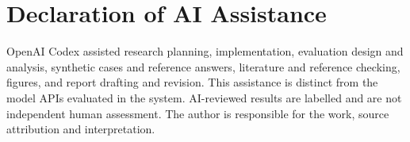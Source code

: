 \section*{Declaration of AI Assistance}
\label{sec:ai-assistance}
OpenAI Codex assisted research planning, implementation, evaluation design and
analysis, synthetic cases and reference answers, literature and reference checking,
figures, and report drafting and revision. This assistance is distinct from the
model APIs evaluated in the system. AI-reviewed results are labelled and are not
independent human assessment. The author is responsible for the work, source
attribution and interpretation.
